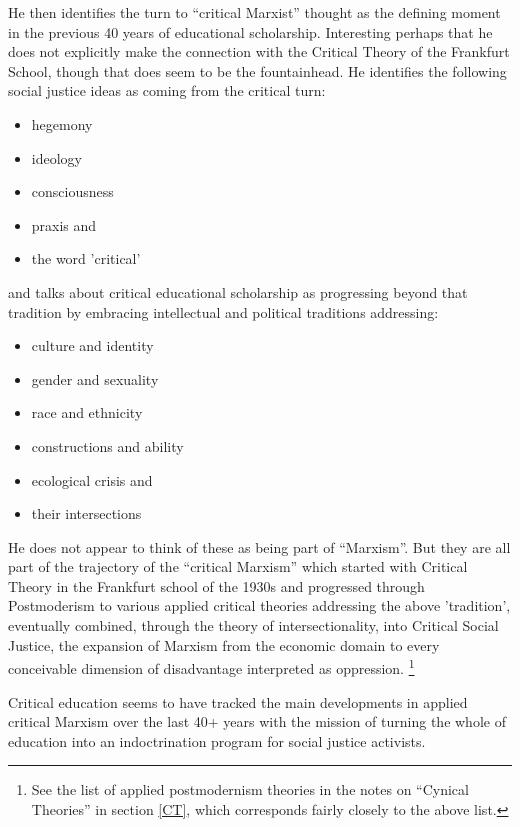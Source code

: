 \documentclass[10pt,titlepage]{book}
\begin{document}
He then identifies the turn to ``critical Marxist'' thought as the defining moment in the previous 40 years of educational scholarship.
Interesting perhaps that he does not explicitly make the connection with the Critical Theory of the Frankfurt School, though that does seem to be the fountainhead.
He identifies the following social justice ideas as coming from the critical turn:

\begin{itemize}
\item hegemony
\item ideology
\item consciousness
\item praxis
  and
  \item the word 'critical'
  \end{itemize}

and talks about critical educational scholarship as progressing beyond that tradition by embracing intellectual and political traditions addressing:

\begin{itemize}
\item culture and identity
\item gender and sexuality
\item race and ethnicity
\item constructions and ability
\item ecological crisis
  and
\item their intersections  
\end{itemize}

He does not appear to think of these as being part of ``Marxism''.
But they are all part of the trajectory of the ``critical Marxism'' which started with Critical Theory in the Frankfurt school of the 1930s and progressed through Postmoderism to various applied critical theories addressing the above 'tradition', eventually combined, through the theory of intersectionality, into Critical Social Justice, the expansion of Marxism from the economic domain to every conceivable dimension of disadvantage interpreted as oppression.%
\footnote{See the list of applied postmodernism theories in the notes on ``Cynical Theories'' in section \ref{CT}, which corresponds fairly closely to the above list.}

Critical education seems to have tracked the main developments in applied critical Marxism over the last 40+ years with the mission of turning the whole of education into an indoctrination program for social justice activists.
\end{document}
